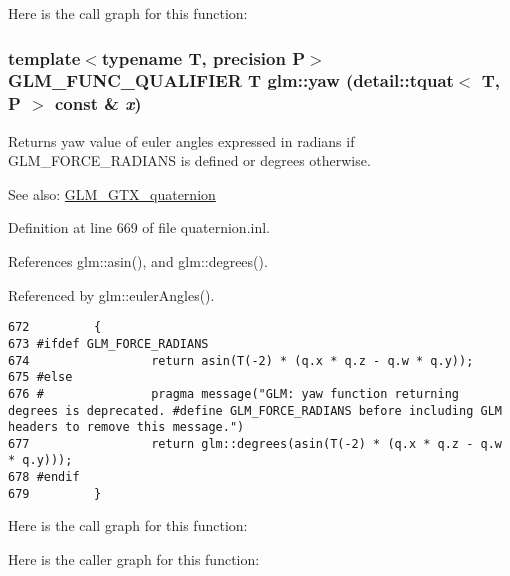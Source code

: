 Here is the call graph for this function:\hypertarget{group__gtc__quaternion_g36e24dea9793778d8b1093daed17eba1}{
\subsubsection[yaw]{\setlength{\rightskip}{0pt plus 5cm}template$<$typename T, precision P$>$ GLM\_\-FUNC\_\-QUALIFIER T glm::yaw (detail::tquat$<$ T, P $>$ const \& {\em x})}}
\label{group__gtc__quaternion_g36e24dea9793778d8b1093daed17eba1}


Returns yaw value of euler angles expressed in radians if GLM\_\-FORCE\_\-RADIANS is defined or degrees otherwise.

\begin{Desc}
\item[See also:]\hyperlink{group__gtx__quaternion}{GLM\_\-GTX\_\-quaternion} \end{Desc}


Definition at line 669 of file quaternion.inl.

References glm::asin(), and glm::degrees().

Referenced by glm::eulerAngles().

\begin{Code}\begin{verbatim}672         {
673 #ifdef GLM_FORCE_RADIANS
674                 return asin(T(-2) * (q.x * q.z - q.w * q.y));
675 #else
676 #               pragma message("GLM: yaw function returning degrees is deprecated. #define GLM_FORCE_RADIANS before including GLM headers to remove this message.")
677                 return glm::degrees(asin(T(-2) * (q.x * q.z - q.w * q.y)));
678 #endif
679         }
\end{verbatim}
\end{Code}




Here is the call graph for this function:

Here is the caller graph for this function: